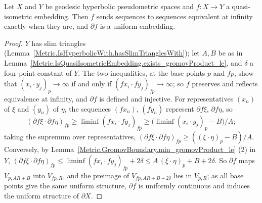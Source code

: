 \begin{theorem}
  \label{Metric.IsQuasiIsometricEmbedding.isUniformEmbedding_gromovBoundaryMap}
  Let $X$ and $Y$ be geodesic hyperbolic pseudometric spaces and $f \colon X \to Y$ a
  quasi-isometric embedding. Then $f$ sends sequences to sequences equivalent at infinity exactly
  when they are, and $\partial f$ is a uniform embedding.
\end{theorem}
\begin{proof}
  $Y$ has slim triangles (Lemma~\ref{Metric.IsHyperbolicWith.hasSlimTrianglesWith}); let $A, B$ be
  as in Lemma~\ref{Metric.IsQuasiIsometricEmbedding.exists_gromovProduct_le}, and $\delta$ a
  four-point constant of $Y$. The two inequalities, at the base points $p$ and $f p$, show that
  $(x_i \cdot y_j)_p \to \infty$ if and only if $(f x_i \cdot f y_j)_{f p} \to \infty$; so $f$
  preserves and reflects equivalence at infinity, and $\partial f$ is defined and injective. For
  representatives $(x_n)$ of $\xi$ and $(y_n)$ of $\eta$, the sequences $(f x_n)$, $(f y_n)$
  represent $\partial f \xi$, $\partial f \eta$, so
  \[ (\partial f \xi \cdot \partial f \eta)_{f p} \ge \liminf (f x_i \cdot f y_j)_{f p} \ge
     \bigl(\liminf (x_i \cdot y_j)_p - B\bigr)/A; \]
  taking the supremum over representatives, $(\partial f \xi \cdot \partial f \eta)_{f p} \ge ((\xi
  \cdot \eta)_p - B)/A$. Conversely, by
  Lemma~\ref{Metric.GromovBoundary.min_gromovProduct_le} (2) in $Y$,
  $(\partial f \xi \cdot \partial f \eta)_{f p} \le \liminf (f x_i \cdot f y_j)_{f p} + 2\delta \le
  A\,(\xi \cdot \eta)_p + B + 2\delta$. So $\partial f$ maps $V_{p, AR + B}$ into $V_{f p, R}$, and
  the preimage of $V_{f p, A R + B + 2\delta}$ lies in $V_{p, R}$; as all base points give the same
  uniform structure, $\partial f$ is uniformly continuous and induces the uniform structure of
  $\partial X$.
\end{proof}

